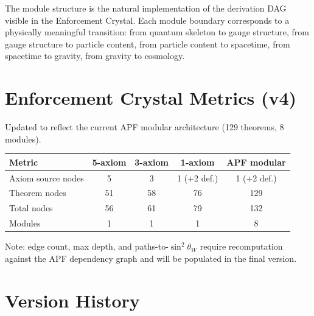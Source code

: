\documentclass[11pt]{article}
\begin{document}
The module structure is the natural implementation of the derivation DAG visible in the Enforcement Crystal.  Each module boundary corresponds to a physically meaningful transition: from quantum skeleton to gauge structure, from gauge structure to particle content, from particle content to spacetime, from spacetime to gravity, from gravity to cosmology.


\section{Enforcement Crystal Metrics (v4)}

Updated to reflect the current APF modular architecture (129 theorems, 8 modules).

\smallskip
\begin{center}
\small
\begin{tabular}{lcccc}
\toprule
\textbf{Metric} & \textbf{5-axiom} & \textbf{3-axiom} & \textbf{1-axiom} & \textbf{APF modular} \\
\midrule
Axiom source nodes & 5 & 3 & 1 (+2 def.) & 1 (+2 def.) \\
Theorem nodes & 51 & 58 & 76 & 129 \\
Total nodes & 56 & 61 & 79 & 132 \\
Modules & 1 & 1 & 1 & 8 \\
\bottomrule
\end{tabular}
\end{center}
\smallskip

\noindent Note: edge count, max depth, and paths-to-$\sin^2\!\theta_W$ require recomputation against the APF dependency graph and will be populated in the final version.


\section{Version History}
\end{document}
